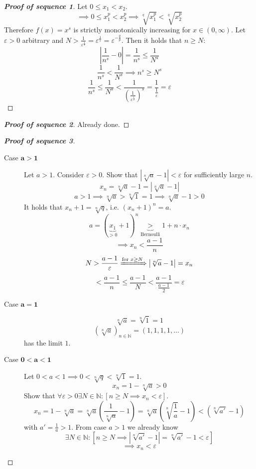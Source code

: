 \documentclass[a4paper,landscape,twocolumn]{article}
\theoremstyle{definition}
\newcommand\abs[1]{\left|#1\right|}
\begin{document}
\begin{proof}[\textbf{Proof of sequence 1}]
  Let $0 \leq x_1 < x_2$.
  \[ \implies 0 \leq x_1^p < x_2^p \implies \sqrt[q]{x_1^p} < \sqrt[q]{x_2^p} \]
  Therefore $f(x) = x^s$ is strictly monotonically increasing for $x \in (0, \infty)$.
  Let $\varepsilon > 0$ arbitrary and $N > \frac1{\varepsilon^{\frac1s}} = \varepsilon^{\frac1s} = \varepsilon^{-\frac qp}$.
  Then it holds that $n \geq N$:
  \[ \abs{\frac1{n^s} - 0} = \frac{1}{n^s} \leq \frac{1}{N^s} \]
  \[ \frac{1}{n^s} < \frac{1}{N^s} \implies n^s \geq N^s \]
  \[
      \frac{1}{n^s} \leq \frac{1}{N^s} < \frac{1}{\left(\frac{1}{\varepsilon^{\frac1s}}\right)^s}
      = \frac{1}{\frac1\varepsilon}
      = \varepsilon
  \]
\end{proof}

\begin{proof}[\textbf{Proof of sequence 2}]
  Already done.
\end{proof}

\begin{proof}[\textbf{Proof of sequence 3}]
  \begin{description}
    \item[Case $\mathbf{a > 1}$]
      Let $a > 1$. Consider $\varepsilon > 0$.
      Show that $\abs{\sqrt[n]{a} - 1} < \varepsilon$ for sufficiently large $n$.
      \[ x_n = \sqrt[n]{a} - 1 = \abs{\sqrt[n]{a} - 1} \]
      \[ a > 1 \implies \sqrt[n]{a} > \sqrt[n]{1} = 1 \implies \sqrt[n]{a} - 1 > 0 \]
      It holds that $x_n + 1 = \sqrt[n]{q}$, i.e. $(x_n + 1)^n = a$.
      \[ a = (\underbrace{x_1}_{> 0} + 1)^n \underbrace{>}_{\text{Bernoulli}} 1 + n \cdot x_n \]
      \[ \implies x_n < \frac{a - 1}{n} \]
      \[ N > \frac{a - 1}{\varepsilon} \xRightarrow{\text{for } x \geq N} \abs{\sqrt[n]{a} - 1} = x_n \]
      \[ < \frac{a - 1}{n} \leq \frac{a - 1}{N} < \frac{a - 1}{\frac{a - 1}{2}} = \varepsilon \]
    \item[Case $\mathbf{a = 1}$]
      \[ \sqrt[n]{a} = \sqrt[n]{1} = 1 \]
      \[ \left(\sqrt[n]{a}\right)_{n \in \mathbb N} = (1, 1, 1, 1, \dots) \]
      has the limit $1$.
    \item[Case $\mathbf{0 < a < 1}$]
      Let $0 < a < 1 \implies 0 < \sqrt[n]{q} < \sqrt[n]{1} = 1$.
      \[ x_n = 1 - \sqrt[n]{a} > 0 \]
      Show that $\forall \varepsilon > 0 \exists N \in \mathbb N: \left[n \geq N \implies x_n < \varepsilon\right]$.
      \[
          x_n
          = 1 - \sqrt[n]{a} = \sqrt[n]{a} \left(\frac{1}{\sqrt[n]{a}} - 1\right)
          = \sqrt[n]{a} \left(\sqrt[n]{\frac1a} - 1\right) < \left(\sqrt[n]{a'} - 1\right)
      \]
      with $a' = \frac1a > 1$.
      From case $a > 1$ we already know
      \[ \exists N \in \mathbb N: \left[n \geq N \implies \abs{\sqrt[n]{a'} - 1} = \sqrt[n]{a'} - 1 < \varepsilon\right] \]
      \[ \implies x_n < \varepsilon \]
  \end{description}
\end{proof}
\end{document}
